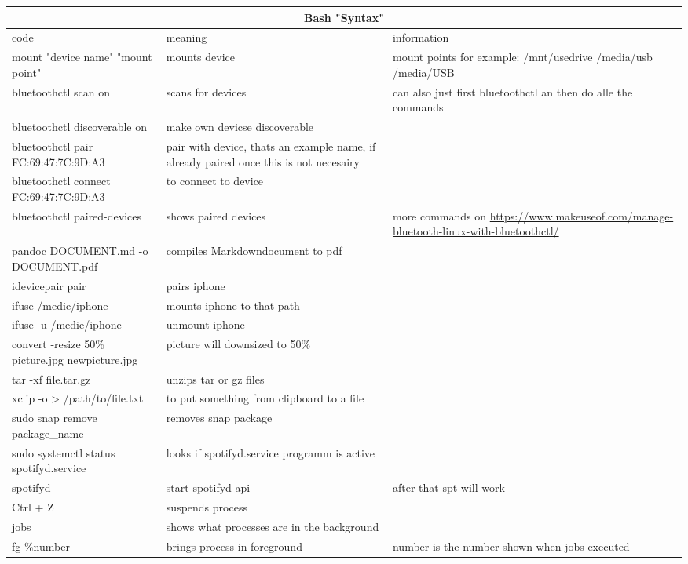 \documentclass[12pt]{article}
\begin{document}
\begin{tabular}{| p{6.5cm} | p{6.5cm} | p{6.5cm} |}
    \hline
    \multicolumn{3}{|c|}{Bash "Syntax"} \\
    \hline
    code & meaning & information\\
    \hline 
    mount "device name" "mount point" & mounts device & mount points for example: /mnt/usedrive /media/usb /media/USB \\
    \hline 
    bluetoothctl scan on & scans for devices & can also just first bluetoothctl an then do alle the commands \\
    \hline 
    bluetoothctl discoverable on & make own devicse discoverable & \\
    \hline 
    bluetoothctl pair FC:69:47:7C:9D:A3 & pair with device, thats an example name, if already paired once this is not necesairy & \\
    \hline 
    bluetoothctl connect FC:69:47:7C:9D:A3 & to connect to device & \\
    \hline
    bluetoothctl paired-devices & shows paired devices &  more commands on \url{https://www.makeuseof.com/manage-bluetooth-linux-with-bluetoothctl/}\\
    \hline 
    pandoc DOCUMENT.md -o DOCUMENT.pdf & compiles Markdowndocument to pdf & \\
    \hline
    idevicepair pair & pairs iphone &\\
    \hline
    ifuse /medie/iphone & mounts iphone to that path &\\
    \hline
    ifuse -u /medie/iphone & unmount iphone & \\
    \hline 
    convert -resize 50\% picture.jpg newpicture.jpg & picture will downsized to 50\% \\
    \hline
    tar -xf file.tar.gz & unzips tar or gz files \\
    \hline
    xclip -o > /path/to/file.txt & to put something from clipboard to a file \\
    \hline 
    sudo snap remove package\_name & removes snap package \\
    \hline
    sudo systemctl status spotifyd.service  & looks if spotifyd.service programm is active \\
    \hline 
    spotifyd & start spotifyd api & after that spt will work \\
    \hline
    Ctrl + Z & suspends process & \\
    \hline 
    jobs & shows what processes are in the background & \\
    \hline
    fg \%number & brings process in foreground & number is the number shown when jobs executed \\
    \hline
\end{tabular}
\newpage
\end{document}
